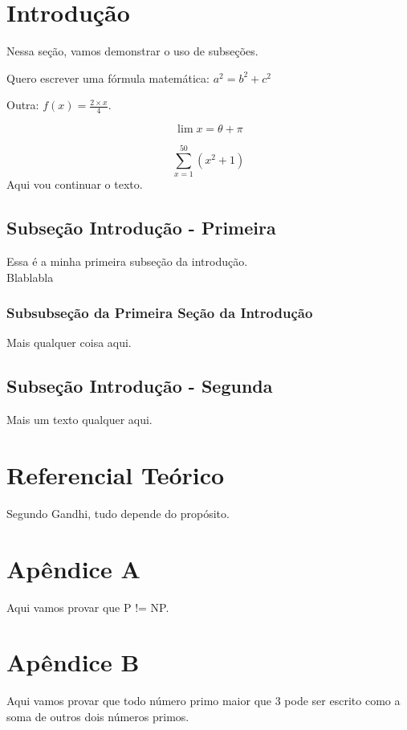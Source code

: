 \documentclass[12pt]{article}
\begin{document}
	
	\maketitle
	
	
	\section{Introdução}
	
	Nessa seção, vamos demonstrar o uso de subseções.
	
	Quero escrever uma fórmula matemática: $a^2 = b^2 + c^2$
	
	Outra: $f(x) = \frac{2 \times x}{4}$.
	
	\[ \lim x = \theta + \pi \]
	
	\[ \sum_{x=1}^{50} (x^2 + 1)\]
	Aqui vou continuar o texto.
	
	\subsection{Subseção Introdução - Primeira}
	
	Essa é a minha primeira {\color{red}subseção da introdução.} \\ Blablabla
	
	\subsubsection{Subsubseção da Primeira Seção da Introdução}
	
	Mais qualquer coisa aqui.
	
	\subsection{Subseção Introdução - Segunda}
	
	Mais um texto qualquer aqui.
	
	\section{Referencial Teórico}
	
	Segundo Gandhi, tudo depende do propósito.
	
\newpage	
	
	\appendix
	
	\section{Apêndice A}
	
	Aqui vamos provar que P != NP.
	
	\section{Apêndice B}
	
	Aqui vamos provar que todo número primo maior que 3 pode ser escrito como a soma de outros dois números primos.
	
	
\end{document}
